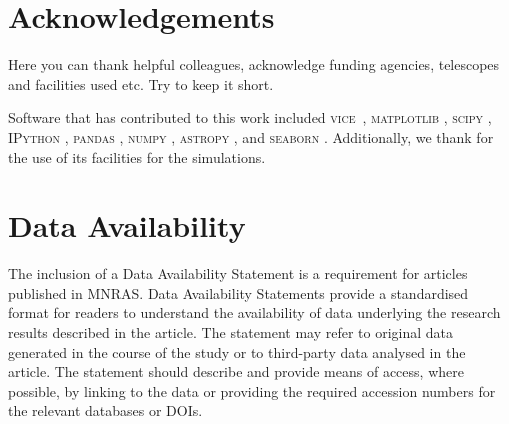 \documentclass[fleqn,
usenatbib]{mnras}
\newcommand{\VICE}{\textsc{vice}}
\begin{document}
\section*{Acknowledgements}

 Here you can thank helpful
colleagues, acknowledge funding agencies, telescopes and facilities used etc.
Try to keep it short.

Software that has contributed to this work included  
\VICE~\citep{JW20, james+21},
\textsc{matplotlib} \citep{matplotlib},
\textsc{scipy} \citep{scipy},
\textsc{IPython} \citep{ipy},
\textsc{pandas} \citep{pandas},
\textsc{numpy} \citep{numpy},
\textsc{astropy} \citep{astropy:2013, astropy:2018, astropy:2022},
and 
\textsc{seaborn} \citep{seaborn}
.
Additionally, we thank \citet{OhioSupercomputerCenter1987} for the use of its facilities for the simulations. 


\section*{Data Availability}

 
The inclusion of a Data Availability Statement is a requirement for articles published in MNRAS. Data Availability Statements provide a standardised format for readers to understand the availability of data underlying the research results described in the article. The statement may refer to original data generated in the course of the study or to third-party data analysed in the article. The statement should describe and provide means of access, where possible, by linking to the data or providing the required accession numbers for the relevant databases or DOIs.







\appendix


\bsp	%
\label{lastpage}
\end{document}
